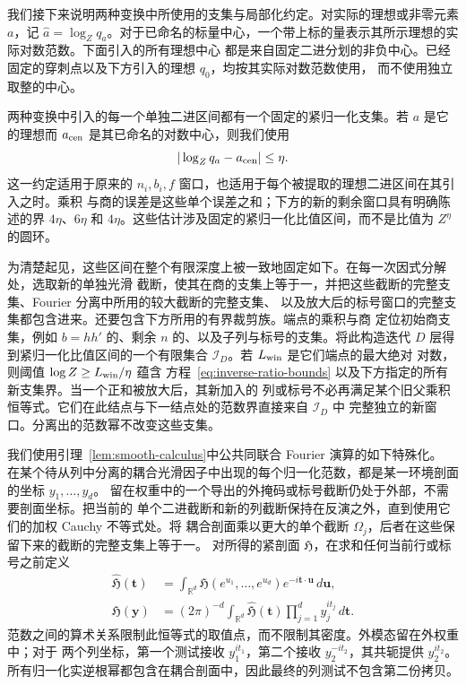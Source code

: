 我们接下来说明两种变换中所使用的支集与局部化约定。对实际的理想或非零元素 \(a\)，记
\(\widehat a=\log_Zq_a\)。对于已命名的标量中心，一个带上标的量表示其所示理想的实际对数范数。下面引入的所有理想中心
都是来自固定二进分划的非负中心。已经固定的穿刺点以及下方引入的理想 \(q_0\)，均按其实际对数范数使用，
而不使用独立取整的中心。

两种变换中引入的每一个单独二进区间都有一个固定的紧归一化支集。若 \(a\) 是它的理想而 \(a_{\rm cen}\)
是其已命名的对数中心，则我们使用
\begin{equation}\label{eq:inverse-ratio-bounds}
 |\log_Zq_a-a_{\rm cen}|\le\eta.
\end{equation}
这一约定适用于原来的 \(n_i,b_i,f\) 窗口，也适用于每个被提取的理想二进区间在其引入之时。乘积
与商的误差是这些单个误差之和；下方的新的剩余窗口具有明确陈述的界 \(4\eta\)、\(6\eta\)
和 \(4\eta\)。这些估计涉及固定的紧归一化比值区间，而不是比值为 \(Z^\eta\) 的圆环。

为清楚起见，这些区间在整个有限深度上被一致地固定如下。在每一次因式分解处，选取新的单独光滑
截断，使其在商的支集上等于一，并把这些截断的完整支集、Fourier 分离中所用的较大截断的完整支集、
以及放大后的标号窗口的完整支集都包含进来。还要包含下方所用的有界裁剪族。端点的乘积与商
定位初始商支集，例如 \(b=hh'\) 的、剩余 \(n\) 的、以及子列与标号的支集。将此构造迭代
\(D\) 层得到紧归一化比值区间的一个有限集合 \(\mathcal I_D\)。若 \(L_{\rm win}\) 是它们端点的最大绝对
对数，则阈值
\(\log Z\ge L_{\rm win}/\eta\) 蕴含
方程~\eqref{eq:inverse-ratio-bounds} 以及下方指定的所有新支集界。当一个正和被放大后，其新加入的
列或标号不必再满足某个旧父乘积恒等式。它们在此结点与下一结点处的范数界直接来自 \(\mathcal I_D\) 中
完整独立的新窗口。分离出的范数幂不改变这些支集。

我们使用引理~\ref{lem:smooth-calculus}中公共同联合 Fourier 演算的如下特殊化。
在某个待从列中分离的耦合光滑因子中出现的每个归一化范数，都是某一环境剖面的坐标 \(y_1,\ldots,y_d\)。
留在权重中的一个导出的外掩码或标号截断仍处于外部，不需要剖面坐标。把当前的
单个二进截断和新的列截断保持在反演之外，直到使用它们的加权 Cauchy 不等式处。将
耦合剖面乘以更大的单个截断 \(\Omega_j\)，后者在这些保留下来的截断的完整支集上等于一。
对所得的紧剖面 \(\mathfrak H\)，在求和任何当前行或标号之前定义
\begin{equation}\label{eq:inverse-log-fourier}
 \begin{split}
 \widehat{\mathfrak H}(\boldsymbol t)
   &=\int_{\mathbb R^d}\mathfrak H(e^{u_1},\ldots,e^{u_d})
             e^{-i\boldsymbol t\cdot\boldsymbol u}\,d\boldsymbol u,\\
 \mathfrak H(\boldsymbol y)
   &=(2\pi)^{-d}\int_{\mathbb R^d}\widehat{\mathfrak H}(\boldsymbol t)
          \prod_{j=1}^dy_j^{it_j}\,d\boldsymbol t.
 \end{split}
\end{equation}
范数之间的算术关系限制此恒等式的取值点，而不限制其密度。外模态留在外权重中；对于
两个列坐标，第一个测试接收 \(y_1^{it_1}\)，第二个接收 \(y_2^{-it_2}\)，其共轭提供
\(y_2^{it_2}\)。所有归一化实逆根幂都包含在耦合剖面中，因此最终的列测试不包含第二份拷贝。

